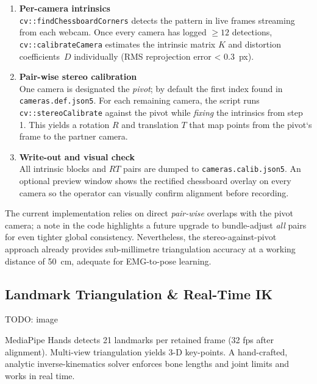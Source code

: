 \begin{enumerate}[label=\arabic*.]
  \item \textbf{Per-camera intrinsics}\\
        \verb|cv::findChessboardCorners| detects the pattern in live frames
        streaming from each webcam. Once every camera has logged
        $\ge12$ detections, \verb|cv::calibrateCamera| estimates the intrinsic
        matrix $K$ and distortion coefficients~$D$ individually
        (RMS reprojection error < \SI{0.3}{px}).

  \item \textbf{Pair-wise stereo calibration}\\
        One camera is designated the \emph{pivot}; by default the first index
        found in \texttt{cameras.def.json5}. For each remaining camera, the
        script runs \verb|cv::stereoCalibrate| against the pivot while
        \emph{fixing} the intrinsics from step 1.
        This yields a rotation $R$ and translation $T$ that map points from the
        pivot`s frame to the partner camera.

  \item \textbf{Write-out and visual check}\\
        All intrinsic blocks and $R\!T$ pairs are dumped to
        \texttt{cameras.calib.json5}. An optional preview window shows the
        rectified chessboard overlay on every camera so the operator can
        visually confirm alignment before recording.
\end{enumerate}

\noindent
The current implementation relies on direct \emph{pair-wise} overlaps with the
pivot camera; a note in the code highlights a future upgrade to bundle-adjust
\emph{all} pairs for even tighter global consistency. Nevertheless, the
stereo-against-pivot approach already provides sub-millimetre triangulation
accuracy at a working distance of \SI{50}{\centi\metre}, adequate for EMG-to-pose
learning.

\subsection{Landmark Triangulation \& Real-Time IK}
TODO: image

MediaPipe Hands detects 21 landmarks per retained frame (32 fps after
alignment). Multi-view triangulation yields 3-D key-points. A hand-crafted,
analytic inverse-kinematics solver enforces bone lengths and joint limits and works in real time.

